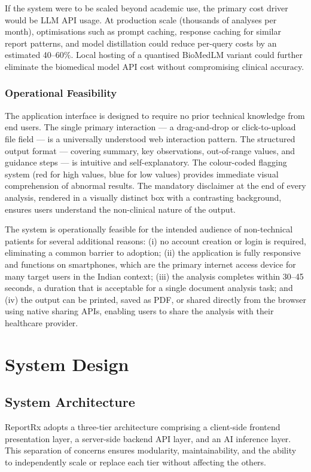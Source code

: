 \documentclass[12pt,a4paper]{report}
\begin{document}
If the system were to be scaled beyond academic use, the primary cost driver would be LLM API usage. At production scale (thousands of analyses per month), optimisations such as prompt caching, response caching for similar report patterns, and model distillation could reduce per-query costs by an estimated 40--60\%. Local hosting of a quantised BioMedLM variant could further eliminate the biomedical model API cost without compromising clinical accuracy.

\subsection{Operational Feasibility}
The application interface is designed to require no prior technical knowledge from end users. The single primary interaction --- a drag-and-drop or click-to-upload file field --- is a universally understood web interaction pattern. The structured output format --- covering summary, key observations, out-of-range values, and guidance steps --- is intuitive and self-explanatory. The colour-coded flagging system (red for high values, blue for low values) provides immediate visual comprehension of abnormal results. The mandatory disclaimer at the end of every analysis, rendered in a visually distinct box with a contrasting background, ensures users understand the non-clinical nature of the output.

The system is operationally feasible for the intended audience of non-technical patients for several additional reasons: (i) no account creation or login is required, eliminating a common barrier to adoption; (ii) the application is fully responsive and functions on smartphones, which are the primary internet access device for many target users in the Indian context; (iii) the analysis completes within 30--45 seconds, a duration that is acceptable for a single document analysis task; and (iv) the output can be printed, saved as PDF, or shared directly from the browser using native sharing APIs, enabling users to share the analysis with their healthcare provider.

\chapter{System Design}

\section{System Architecture}
ReportRx adopts a three-tier architecture comprising a client-side frontend presentation layer, a server-side backend API layer, and an AI inference layer. This separation of concerns ensures modularity, maintainability, and the ability to independently scale or replace each tier without affecting the others.
\end{document}
